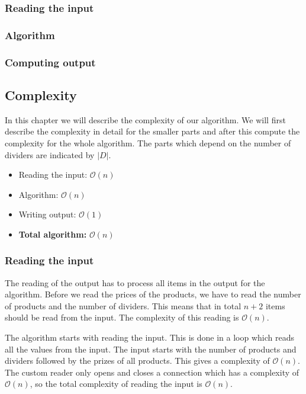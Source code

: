\documentclass{article}
\newcommand{\bigO}[1]{\mathcal{O}(#1)}
\begin{document}
\subsubsection{Reading the input}

\subsubsection{Algorithm}

\subsubsection{Computing output}

\subsection{Complexity}
In this chapter we will describe the complexity of our algorithm. We will first describe the complexity in detail for the smaller parts and after this compute the complexity for the whole algorithm. The parts which depend on the number of dividers are indicated by $|D|$.

\begin{itemize}
  \item Reading the input: $\bigO{n}$
  \item Algorithm: $\bigO{n}$
  \item Writing output: $\bigO{1}$
  \item \textbf{Total algorithm:} $\bigO{n}$
\end{itemize}

\subsubsection{Reading the input}
The reading of the output has to process all items in the output for the algorithm. Before we read the prices of the products, we have to read the number of products and the number of dividers. This means that in total $n + 2$ items should be read from the input. The complexity of this reading is $\bigO{n}$.

The algorithm starts with reading the input. This is done in a loop which reads all the values from the input. The input starts with the number of products and dividers followed by the prizes of all products. This gives a complexity of $\bigO{n}$. The custom reader only opens and closes a connection which has a complexity of $\bigO{n}$, so the total complexity of reading the input is $\bigO{n}$.
\end{document}
